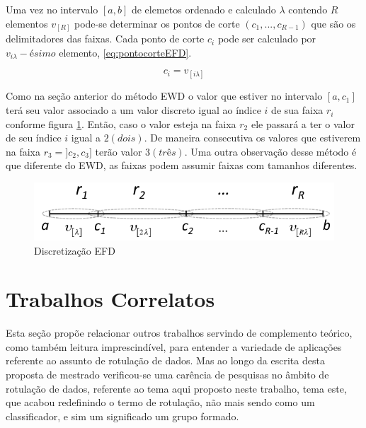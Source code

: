 Uma vez no intervalo ${[a,b]}$ de elemetos ordenado e calculado ${\lambda}$ contendo ${R}$ elementos ${v_{[R]}}$  pode-se determinar os pontos de corte ${(c_1,...,c_{R-1})}$ que são os delimitadores das faixas. Cada ponto de corte ${c_i}$ pode ser calculado por ${v_{i\lambda}-ésimo}$ elemento, \ref{eq:pontocorteEFD}.

\begin{equation}
c_i = v_{[i\lambda]}
 \label{eq:pontocorteEFD}
\end{equation}

Como na seção anterior do método EWD o valor que estiver no intervalo ${[a,c_1]}$ terá seu valor associado a um valor discreto igual ao índice ${i}$ de sua faixa ${r_i}$ conforme figura \ref{fig:faixasEFD}. Então, caso o valor esteja na faixa ${r_2}$ ele passará a ter o valor de seu índice ${i}$ igual a ${2(dois)}$. De maneira consecutiva os valores que estiverem na faixa ${r_3=]c_2,c_3]}$ terão valor ${3(três)}$. Uma outra observação desse método é que diferente do EWD, as faixas podem assumir faixas com tamanhos diferentes.

\begin{figure}[h]
        \centering
        \includegraphics[scale=0.6]{figs/discretizacaoEFD.png}
        \caption[Discretização EFD]{Discretização EFD\footnotemark} 
        \label{fig:faixasEFD}
\end{figure} 


\section{Trabalhos Correlatos}\label{cap:refTeor:sec:trabcorrel}

Esta seção propõe relacionar outros trabalhos servindo de complemento teórico, como também leitura imprescindível, para entender a variedade de aplicações referente ao assunto de rotulação de dados. Mas ao longo da escrita desta proposta de mestrado verificou-se uma carência de pesquisas no âmbito de rotulação de dados, referente ao tema aqui proposto neste trabalho, tema este, que acabou redefinindo o termo de rotulação, não mais sendo como um classificador, e sim um significado um grupo formado.

